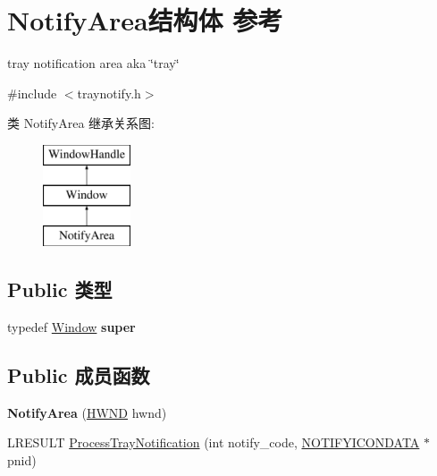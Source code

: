 \hypertarget{struct_notify_area}{}\section{Notify\+Area结构体 参考}
\label{struct_notify_area}


tray notification area aka \char`\"{}tray\char`\"{}  




{\ttfamily \#include $<$traynotify.\+h$>$}

类 Notify\+Area 继承关系图\+:\begin{figure}[H]
\begin{center}
\leavevmode
\includegraphics[height=3.000000cm]{struct_notify_area}
\end{center}
\end{figure}
\subsection*{Public 类型}
\begin{DoxyCompactItemize}
\item 
\mbox{\label{struct_notify_area_a230e9488bba2452952c9ece0a2ea2312}} 
typedef \hyperlink{struct_window}{Window} {\bfseries super}
\end{DoxyCompactItemize}
\subsection*{Public 成员函数}
\begin{DoxyCompactItemize}
\item 
\mbox{\label{struct_notify_area_a6b7caa6abed2b3a040d173a0d6a8f440}} 
{\bfseries Notify\+Area} (\hyperlink{interfacevoid}{H\+W\+ND} hwnd)
\item 
L\+R\+E\+S\+U\+LT \hyperlink{struct_notify_area_a60932b40496653a975e3a71d7f4b92c8}{Process\+Tray\+Notification} (int notify\+\_\+code, \hyperlink{struct___n_o_t_i_f_y_i_c_o_n_d_a_t_a_a}{N\+O\+T\+I\+F\+Y\+I\+C\+O\+N\+D\+A\+TA} $\ast$pnid)
\end{DoxyCompactItemize}
